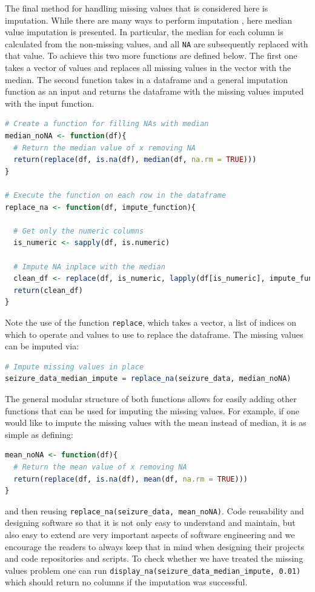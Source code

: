 The final method for handling missing values that is considered here is imputation. While there are many ways to perform imputation \cite{buuren2018flexible}, here median value imputation is presented. In particular, the median for each column is calculated from the non-missing values, and all \verb|NA| are subsequently replaced with that value. To achieve this two more functions are defined below. The first one takes a vector of values and replaces all missing values in the vector with the median. The second function takes in a dataframe and a general imputation function as an input and returns the dataframe with the missing values imputed with the input function.
\begin{lstlisting}[language=R]
# Create a function for filling NAs with median
median_noNA <- function(df){
  # Return the median value of x removing NA
  return(replace(df, is.na(df), median(df, na.rm = TRUE)))
}

# Execute the function on each row in the dataframe
replace_na <- function(df, impute_function){

  # Get only the numeric columns
  is_numeric <- sapply(df, is.numeric)

  # Impute NA inplace with the median
  clean_df <- replace(df, is_numeric, lapply(df[is_numeric], impute_function))
  return(clean_df)
}
\end{lstlisting}
Note the use of the function \verb|replace|, which takes a vector, a list of indices on which to operate and values to use to replace the dataframe.
The missing values can be imputed via:
\begin{lstlisting}[language=R]
# Impute missing values in place
seizure_data_median_impute = replace_na(seizure_data, median_noNA)
\end{lstlisting}
The general modular structure of both functions allows for easily adding other functions that can be used for imputing the missing values. For example, if one would like to impute the missing values with the mean instead of median, it is as simple as defining:
\begin{lstlisting}[language=R]
mean_noNA <- function(df){
  # Return the mean value of x removing NA
  return(replace(df, is.na(df), mean(df, na.rm = TRUE)))
}
\end{lstlisting}
and then reusing \verb|replace_na(seizure_data, mean_noNA)|. Code reusability and designing software so that it is not only easy to understand and maintain, but also easy to extend are very important aspects of software engineering and we encourage the readers to always keep that in mind when designing their projects and code repositories and scripts. To check whether we have treated the missing values problem one can run \verb|display_na(seizure_data_median_impute, 0.01)| which should return no columns if the imputation was successful.

